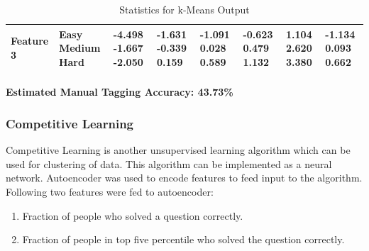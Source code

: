 \documentclass[12pt]{article}
\begin{document}
\begin{center}
\begin{table}[h]
\begin{tabular}{ | m{2cm} | m{1.7cm} | m{1.3cm} | m{1.3cm} | m{1.5cm} | m{1.3cm} | m{1.3cm} | m{1.3cm} | }
		\hline
		\textbf{Feature 3} & \textbf{Easy Medium Hard} & -4.498 \hspace{5mm}-1.667 \hspace{5mm}-2.050 & -1.631 \hspace{5mm}-0.339 \hspace{5mm}0.159 & -1.091  \hspace{5mm}0.028 \hspace{5mm}0.589 & -0.623 \hspace{5mm}0.479 \hspace{5mm}1.132 & 1.104 \hspace{5mm}2.620 \hspace{5mm}3.380 & -1.134 \hspace{5mm}0.093 \hspace{5mm}0.662\\
		\hline
		\end{tabular}
		\caption{Statistics for k-Means Output}
	\end{table}
	\end{center}
	
	\paragraph{Estimated Manual Tagging Accuracy: 43.73\%}
	
	
	\newpage
	\subsubsection{Competitive Learning}
	Competitive Learning is another unsupervised learning algorithm which can
	be used for	clustering of data. This algorithm can be implemented as
	a neural network. Autoencoder was used to encode features to feed input
	to the algorithm. Following two features were fed to autoencoder:
	\begin{enumerate}
	\item Fraction of people who solved a question correctly.
	\item Fraction of people in top five percentile who solved the question
	correctly.
	\end{enumerate}
	
\end{document}
